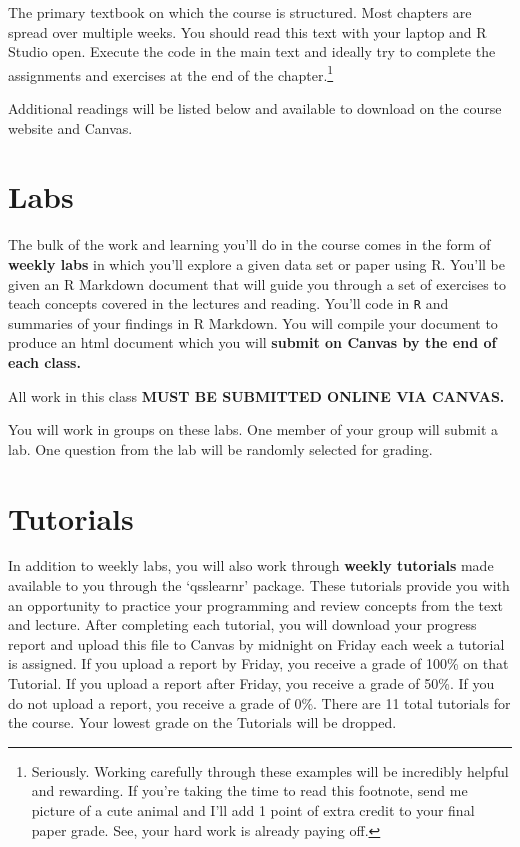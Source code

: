 \textbf{} 

The primary textbook on which the course is structured. Most chapters are spread over multiple weeks. You should read this text with your laptop and R Studio open. Execute the code in the main text and ideally try to complete the assignments and exercises at the end of the chapter.\footnote{Seriously. Working carefully through these examples will be incredibly helpful and rewarding. If you're taking the time to read this footnote, send me picture of a cute animal and I'll add 1 point of extra credit to your final paper grade. See, your hard work is already paying off.} 

Additional readings will be listed below and available to download on the course website and Canvas. 


\section{Labs}

The bulk of the work and learning you'll do in the course comes in the form of \textbf{weekly labs} in which you'll explore a given data set or paper using R. You'll be given an R Markdown document that will guide you through a set of exercises to teach concepts covered in the lectures and reading. You'll code in \texttt{R} and summaries of your findings in R Markdown. You will compile your document to produce an html document which you will \textbf{submit on Canvas by the end of each class.}

All work in this class \textbf{MUST BE SUBMITTED ONLINE VIA CANVAS.}

You will work in groups on these labs. One member of your group will submit a lab. One question from the lab will be randomly selected for grading. 

\section{Tutorials}

In addition to weekly labs, you will also work through \textbf{weekly tutorials} made available to you through the `qsslearnr' package. These tutorials provide you with an opportunity to practice your programming and review concepts from the text and lecture. After completing each tutorial, you will download your progress report and upload this file to Canvas by midnight on Friday each week a tutorial is assigned. If you upload a report by Friday, you receive a grade of 100\% on that Tutorial. If you upload a report after Friday, you receive a grade of 50\%. If you do not upload a report, you receive a grade of 0\%. There are 11 total tutorials for the course. Your lowest grade on the Tutorials will be dropped.

